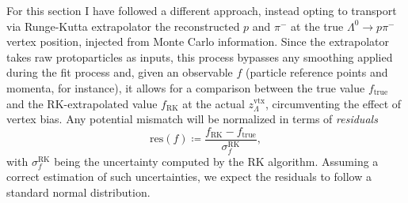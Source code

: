 For this section I have followed a different approach, instead opting to transport via Runge-Kutta extrapolator the reconstructed $p$ and $\pi^-$ at the true  $\Lambda^0 \rightarrow p\pi^-$ vertex position, injected from Monte Carlo information.
Since the extrapolator takes raw protoparticles as inputs, this process bypasses any smoothing applied during the fit process and, given an observable $f$ (particle reference points and momenta, for instance), it allows for a comparison between the true value $f_\text{true}$ and the RK-extrapolated value $f_\text{RK}$ at the actual $z_\Lambda^\text{vtx}$, circumventing the effect of vertex bias.
Any potential mismatch will be normalized in terms of \textit{residuals}
\begin{equation}
	\text{res}(f) \coloneqq \frac{f_\text{RK} - f_\text{true}}{\sigma_f^\text{RK}},
\end{equation}
with $\sigma_f^\text{RK}$ being the uncertainty computed by the RK algorithm.
Assuming a correct estimation of such uncertainties, we expect the residuals to follow a standard normal distribution.

